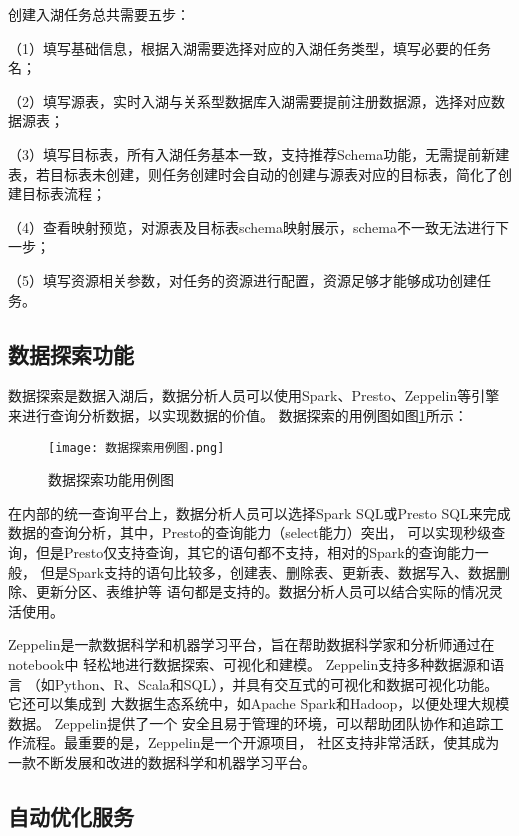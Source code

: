 创建入湖任务总共需要五步：

（1）填写基础信息，根据入湖需要选择对应的入湖任务类型，填写必要的任务名；

（2）填写源表，实时入湖与关系型数据库入湖需要提前注册数据源，选择对应数据源表；

（3）填写目标表，所有入湖任务基本一致，支持推荐Schema功能，无需提前新建表，若目标表未创建，则任务创建时会自动的创建与源表对应的目标表，简化了创建目标表流程；

（4）查看映射预览，对源表及目标表schema映射展示，schema不一致无法进行下一步；

（5）填写资源相关参数，对任务的资源进行配置，资源足够才能够成功创建任务。

\subsection{数据探索功能}

数据探索是数据入湖后，数据分析人员可以使用Spark、Presto、Zeppelin等引擎来进行查询分析数据，以实现数据的价值。
数据探索的用例图如图\ref{fig:数据探索用例图}所示：

\begin{figure}[H]
  \centering
  \texttt{[image: 数据探索用例图.png]}
  \caption{数据探索功能用例图}
  \label{fig:数据探索用例图}
\end{figure}

在内部的统一查询平台上，数据分析人员可以选择Spark SQL或Presto SQL来完成数据的查询分析，其中，Presto的查询能力（select能力）突出，
可以实现秒级查询，但是Presto仅支持查询，其它的语句都不支持，相对的Spark的查询能力一般，
但是Spark支持的语句比较多，创建表、删除表、更新表、数据写入、数据删除、更新分区、表维护等
语句都是支持的。数据分析人员可以结合实际的情况灵活使用。

Zeppelin是一款数据科学和机器学习平台，旨在帮助数据科学家和分析师通过在notebook中
轻松地进行数据探索、可视化和建模。 Zeppelin支持多种数据源和语言
（如Python、R、Scala和SQL），并具有交互式的可视化和数据可视化功能。它还可以集成到
大数据生态系统中，如Apache Spark和Hadoop，以便处理大规模数据。 Zeppelin提供了一个
安全且易于管理的环境，可以帮助团队协作和追踪工作流程。最重要的是，Zeppelin是一个开源项目，
社区支持非常活跃，使其成为一款不断发展和改进的数据科学和机器学习平台\cite{34}。

\subsection{自动优化服务}

